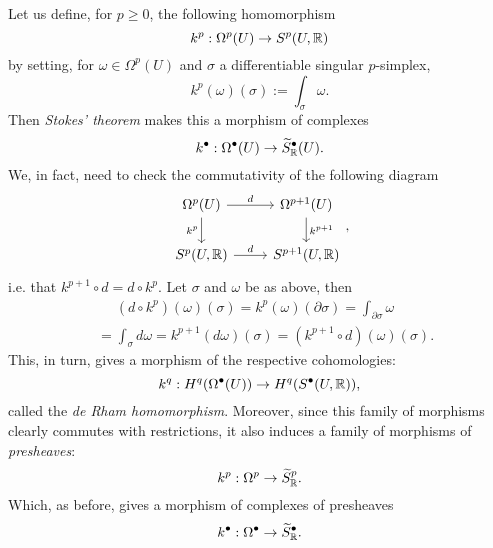 \begin{rem}
	Let us define, for $p \geq 0$, the following homomorphism
	\begin{equation}
		k^p: \Omega^p(U) \to S^p(U,\mathbb{R})
	\end{equation} 
	by setting, for $\omega \in \Omega^p(U)$ and $\sigma$ a differentiable singular $p$-simplex,
	\begin{equation}
		k^p(\omega)(\sigma) := \int_{\sigma}^{} \omega 
	.\end{equation} 
	Then \textit{Stokes' theorem} makes this a morphism of complexes
	\begin{equation}
		k^\bullet: \Omega^\bullet(U) \to \widetilde{S}^\bullet_{\mathbb{R}}(U)
	.\end{equation} 
	We, in fact, need to check the commutativity of the following diagram
	\begin{equation}
	\begin{tikzcd}
		\Omega^p(U) \arrow[r, "d", rightarrow] \arrow[d, "k^p"', rightarrow] & \Omega^{p+1}(U) \arrow[d, "k^{p+1}", rightarrow] \\
		S^p(U,\R) \arrow[r, "d", rightarrow] & S^{p+1}(U,\R)
	\end{tikzcd}
	,\end{equation} 
	i.e. that $k^{p+1} \circ d = d \circ k^p$.
	Let $\sigma$ and $\omega$ be as above, then
	\begin{align}
		&\phantom{=}(d \circ k^p)(\omega) (\sigma) = k^p(\omega) (\partial\sigma) = \int_{\partial\sigma}^{} \omega\\
		&= \int_{\sigma}^{} d\omega = k^{p+1}(d\omega) (\sigma) = (k^{p+1} \circ d) (\omega) (\sigma)
	.\end{align} 
	This, in turn, gives a morphism of the respective cohomologies:
	\begin{equation}
		k^q: H^q(\Omega^\bullet(U)) \to H^q(S^\bullet(U,\mathbb{R}))
	,\end{equation} 
	called the \textit{de Rham homomorphism}.
	Moreover, since this family of morphisms clearly commutes with restrictions, it also induces a family of morphisms of \textit{presheaves}:
	\begin{equation}
		k^p: \Omega^p \to \widetilde{S}^p_{\mathbb{R}}
	.\end{equation} 
	Which, as before, gives a morphism of complexes of presheaves
	\begin{equation}
		k^\bullet: \Omega^\bullet \to \widetilde{S}^\bullet_{\mathbb{R}}
	.\end{equation} 
\end{rem}

